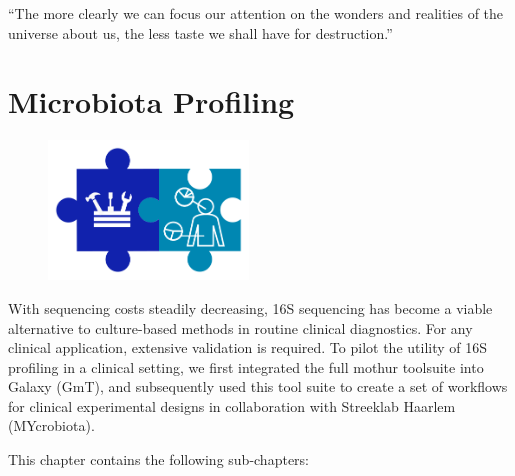 \cleartorightpage
\begin{savequote}[75mm]
“The more clearly we can focus our attention on the wonders and realities of the universe about us, the less taste we shall have for destruction.”
\end{savequote}

\chapter{Microbiota Profiling}\label{chapter:microbiota}
\setcounter{figure}{-1}
\setcounter{table}{-1}
\setcounter{section}{-1}

\begin{figure}[t!]
\includegraphics[height=10em]{frontmatter/images/chapter-header-microbiota-tools.png}
\end{figure}
\setcounter{figure}{-1}
\setcounter{table}{-1}
\setcounter{section}{-1}

With sequencing costs steadily decreasing, 16S sequencing has become a viable alternative to culture-based methods in routine clinical diagnostics. For any clinical application, extensive validation is required. To pilot the utility of 16S profiling in a clinical setting, we first integrated the full mothur toolsuite into Galaxy (GmT), and subsequently used this tool suite to create a set of workflows for clinical experimental designs in collaboration with Streeklab Haarlem (MYcrobiota).

This chapter contains the following sub-chapters:

